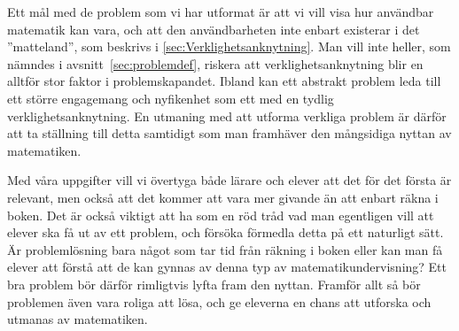\textcolor{Mahogany}{
    Ett mål med de problem som vi har utformat är att vi vill visa hur användbar matematik kan vara, och att den användbarheten inte enbart existerar i det ''matteland'', som beskrivs i \ref{sec:Verklighetsanknytning}.  Man vill inte heller, som nämndes i avsnitt~\ref{sec:problemdef}, riskera att verklighetsanknytning blir en alltför stor faktor i problemskapandet. Ibland kan ett abstrakt problem leda till ett större engagemang och nyfikenhet som ett med en tydlig verklighetsanknytning. En utmaning med att utforma verkliga problem är därför att ta ställning till detta samtidigt som man framhäver den mångsidiga nyttan av matematiken.
}

 
\textcolor{Mahogany}{
    Med våra uppgifter vill vi övertyga både lärare och elever att det för det första är relevant, men också att det kommer att vara mer givande än att enbart räkna i boken. Det är också viktigt att ha som en röd tråd vad man egentligen vill att elever ska få ut av ett problem, och försöka förmedla detta på ett naturligt sätt. Är problemlösning bara något som tar tid från räkning i boken eller kan man få elever att förstå att de kan gynnas av denna typ av matematikundervisning? Ett bra problem bör därför rimligtvis lyfta fram den nyttan. Framför allt så bör problemen även vara roliga att lösa, och ge eleverna en chans att utforska och utmanas av matematiken.
}

